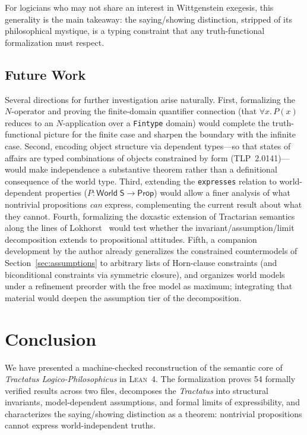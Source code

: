 \documentclass[10pt, letterpaper]{article}
\theoremstyle{definition}
\theoremstyle{remark}
\newcommand{\Sach}{\mathsf{S}}
\newcommand{\World}{\mathsf{World}}
\newcommand{\Prop}{\mathsf{Prop}}
\newcommand{\Lean}{\textsc{Lean}}
\begin{document}
For logicians who may not share an interest in Wittgenstein
exegesis, this generality is the main takeaway: the
saying/showing distinction, stripped of its philosophical
mystique, is a typing constraint that any truth-functional
formalization must respect.

\subsection{Future Work}
\label{sec:future}

Several directions for further investigation arise naturally.
First, formalizing the $N$-operator and proving the
finite-domain quantifier connection (that $\forall x.\, P(x)$
reduces to an $N$-application over a \texttt{Fintype} domain)
would complete the truth-functional picture for the finite
case and sharpen the boundary with the infinite case.
Second, encoding object structure via dependent types---so
that states of affairs are typed combinations of objects
constrained by form (TLP~2.0141)---would make independence
a substantive theorem rather than a definitional consequence
of the world type.
Third, extending the \texttt{expresses} relation to
world-dependent properties ($P : \World\;\Sach \to \Prop$)
would allow a finer analysis of what nontrivial propositions
\emph{can} express, complementing the current result about
what they cannot.
Fourth, formalizing the doxastic extension of Tractarian
semantics along the lines of Lokhorst~\cite{lokhorst1988}
would test whether the invariant/assumption/limit decomposition
extends to propositional attitudes.
Fifth, a companion development by the author already generalizes
the constrained countermodels of Section~\ref{sec:assumptions}
to arbitrary lists of Horn-clause constraints (and biconditional
constraints via symmetric closure), and organizes world models
under a refinement preorder with the free model as maximum;
integrating that material would deepen the assumption tier of
the decomposition.

\section{Conclusion}
\label{sec:conclusion}

We have presented a machine-checked reconstruction of the
semantic core of \emph{Tractatus Logico-Philosophicus} in
\Lean~4.  The formalization proves 54 formally verified results
across two files, decomposes the
\emph{Tractatus} into structural invariants, model-dependent
assumptions, and formal limits of expressibility, and
characterizes the saying/showing distinction as a theorem:
nontrivial propositions cannot express world-independent truths.
\end{document}
